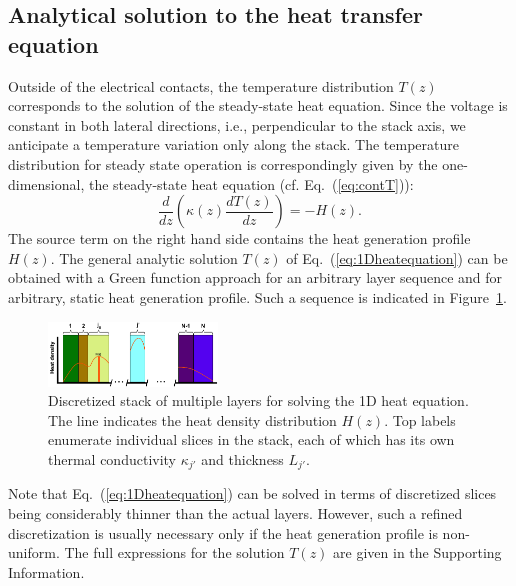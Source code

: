 \documentclass[%
9pt,
 aip,
rsi,%
 amsmath,amssymb,
preprint,%
]{revtex4-1}
\begin{document}
\subsection{Analytical solution to the heat transfer equation}
Outside of the electrical contacts, the temperature distribution $T(z)$ corresponds to the solution of the steady-state heat equation. 
Since the voltage is constant in both lateral directions, i.e., perpendicular to the stack axis, we anticipate a temperature variation only along the stack. The temperature distribution for steady state operation is correspondingly given by the one-dimensional, the steady-state heat equation (cf. Eq.~(\ref{eq:contT})):
\begin{equation}
	\label{eq:1Dheatequation}
    \frac{d}{dz}\left(\kappa(z) \frac{dT(z)}{dz}\right) = -H(z).
\end{equation}
The source term on the right hand side contains the heat generation profile $H(z)$.
The general analytic solution $T(z)$ of Eq.~(\ref{eq:1Dheatequation}) can be obtained with a Green function approach for an arbitrary layer sequence and for arbitrary, static heat generation profile. 
Such a sequence is indicated in Figure~\ref{fig:MultiLayersSetup}.
\begin{figure}
	\centering
	\includegraphics[width=0.4\textwidth]{General_plots_3.eps}
	\caption{Discretized stack of multiple layers for solving the 1D heat equation. The line indicates the heat density distribution $H(z)$. Top labels enumerate individual slices in the stack, each of which has its own thermal conductivity $\kappa_{j'}$ and thickness $L_{j'}$. }
	\label{fig:MultiLayersSetup}
\end{figure}
Note that Eq.~(\ref{eq:1Dheatequation}) can be solved in terms of discretized slices being considerably thinner than the actual layers. However, such a refined discretization is usually necessary only if the heat generation profile is non-uniform.
The full expressions for the solution $T(z)$ are given in the Supporting Information. 
\end{document}
